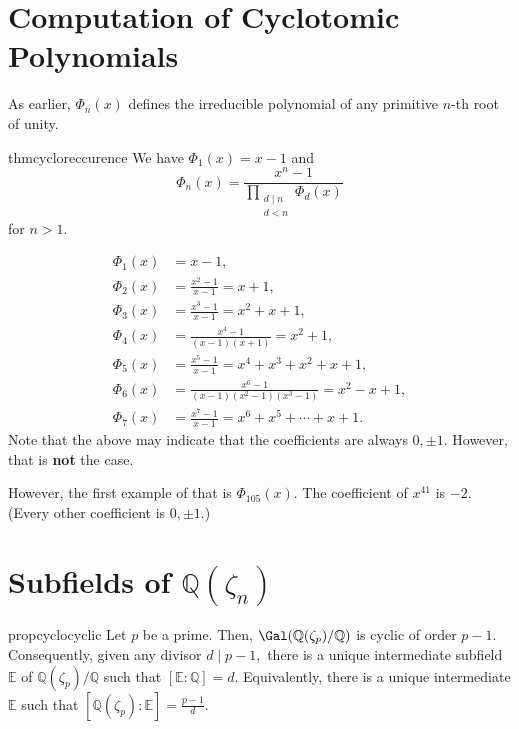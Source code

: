 \section{Computation of Cyclotomic Polynomials}
As earlier, $\Phi_n(x)$ defines the irreducible polynomial of any primitive $n$-th root of unity.

\begin{restatable}[]{thm}{cycloreccurence}
\label{thm:cycloreccurence}
    We have $\Phi_1(x) = x - 1$ and
    \begin{equation*} 
        \Phi_n(x) = \frac{x^n - 1}{\displaystyle\prod_{\substack{d \mid n\\ d < n}} \Phi_d(x)}
    \end{equation*}
    for $n > 1.$ \hfill\hyperref[thm:cycloreccurence2]{\downsym}
\end{restatable}

\begin{ex}
    \begin{align*} 
        \Phi_1(x) &= x - 1, \\
        \Phi_2(x) &= \frac{x^2 - 1}{x - 1} = x + 1, \\
        \Phi_3(x) &= \frac{x^3 - 1}{x - 1} = x^2 + x + 1, \\
        \Phi_4(x) &= \frac{x^4 - 1}{(x - 1)(x + 1)} = x^2 + 1, \\
        \Phi_5(x) &= \frac{x^5 - 1}{x - 1} = x^4 + x^3 + x^2 + x + 1, \\
        \Phi_6(x) &= \frac{x^6 - 1}{(x - 1)(x^2 - 1)(x^3 - 1)} = x^2 - x + 1, \\
        \Phi_7(x) &= \frac{x^7 - 1}{x - 1} = x^6 + x^5 + \cdots + x + 1.
    \end{align*}
    Note that the above may indicate that the coefficients are always $0, \pm 1.$ However, that is \textbf{not} the case.

    However, the first example of that is $\Phi_{105}(x).$ The coefficient of $x^{41}$ is $-2.$ (Every other coefficient is $0, \pm 1.$)
\end{ex}

\section{Subfields of \texorpdfstring{$\mathbb{Q}(\zeta_n)$}{Q(zn)}}

\begin{restatable}[]{prop}{cyclocyclic}
\label{prop:cyclocyclic}
    Let $p$ be a prime. Then, $\Gal(\mathbb{Q}(\zeta_p)/\mathbb{Q})$ is cyclic of order $p - 1.$ Consequently, given any divisor $d \mid p - 1,$ there is a unique intermediate subfield $\mathbb{E}$ of $\mathbb{Q}(\zeta_p)/\mathbb{Q}$ such that $[\mathbb{E} : \mathbb{Q}] = d.$ Equivalently, there is a unique intermediate $\mathbb{E}$ such that $[\mathbb{Q}(\zeta_p) : \mathbb{E}] = \frac{p - 1}{d}.$ \hfill\hyperref[prop:cyclocyclic2]{\downsym}
\end{restatable}

